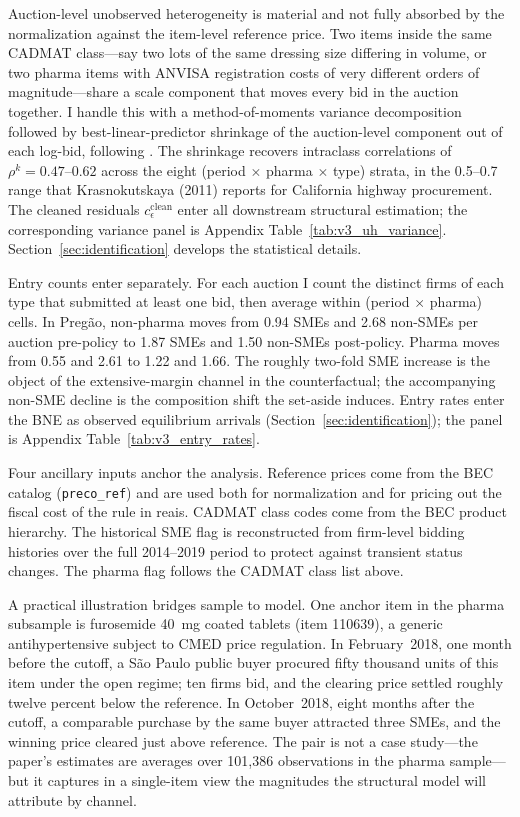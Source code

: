 Auction-level unobserved heterogeneity is material and not fully absorbed by the normalization against the item-level reference price. Two items inside the same CADMAT class---say two lots of the same dressing size differing in volume, or two pharma items with ANVISA registration costs of very different orders of magnitude---share a scale component that moves every bid in the auction together. I handle this with a method-of-moments variance decomposition followed by best-linear-predictor shrinkage of the auction-level component out of each log-bid, following \citet{krasnokutskaya2011}. The shrinkage recovers intraclass correlations of $\rho^k = 0.47$--$0.62$ across the eight (period $\times$ pharma $\times$ type) strata, in the 0.5--0.7 range that Krasnokutskaya (2011) reports for California highway procurement. The cleaned residuals $c_\epsilon^{\text{clean}}$ enter all downstream structural estimation; the corresponding variance panel is Appendix Table~\ref{tab:v3_uh_variance}. Section~\ref{sec:identification} develops the statistical details.

Entry counts enter separately. For each auction I count the distinct firms of each type that submitted at least one bid, then average within (period $\times$ pharma) cells. In Preg\~ao, non-pharma moves from 0.94 SMEs and 2.68 non-SMEs per auction pre-policy to 1.87 SMEs and 1.50 non-SMEs post-policy. Pharma moves from 0.55 and 2.61 to 1.22 and 1.66. The roughly two-fold SME increase is the object of the extensive-margin channel in the counterfactual; the accompanying non-SME decline is the composition shift the set-aside induces. Entry rates enter the BNE as observed equilibrium arrivals (Section~\ref{sec:identification}); the panel is Appendix Table~\ref{tab:v3_entry_rates}.

Four ancillary inputs anchor the analysis. Reference prices come from the BEC catalog (\texttt{preco\_ref}) and are used both for normalization and for pricing out the fiscal cost of the rule in reais. CADMAT class codes come from the BEC product hierarchy. The historical SME flag is reconstructed from firm-level bidding histories over the full 2014--2019 period to protect against transient status changes. The pharma flag follows the CADMAT class list above.

A practical illustration bridges sample to model. One anchor item in the pharma subsample is furosemide 40~mg coated tablets (item 110639), a generic antihypertensive subject to CMED price regulation. In February~2018, one month before the cutoff, a S\~ao Paulo public buyer procured fifty thousand units of this item under the open regime; ten firms bid, and the clearing price settled roughly twelve percent below the reference. In October~2018, eight months after the cutoff, a comparable purchase by the same buyer attracted three SMEs, and the winning price cleared just above reference. The pair is not a case study---the paper's estimates are averages over 101{,}386 observations in the pharma sample---but it captures in a single-item view the magnitudes the structural model will attribute by channel.
